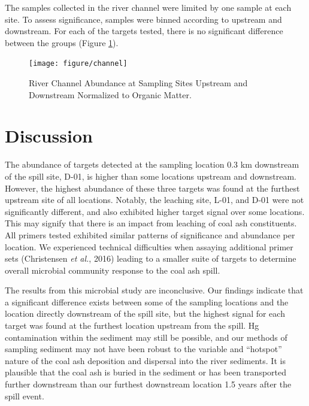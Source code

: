 \documentclass[ms, hidelinks]{uncgdissertationexp}
\theoremstyle{plain}
\theoremstyle{definition}
\theoremstyle{remark}
\begin{document}
The samples collected in the river channel were limited by one sample at each site. To assess significance, samples were binned according to upstream and downstream. For each of the targets tested, there is no significant difference between the groups (Figure \ref{fig:channel}).
\begin{figure}[htbp]
  \texttt{[image: figure/channel]}
  \caption[River Channel Abundance at Sampling Sites Upstream and Downstream Normalized to Organic Matter.]{River Channel Abundance at Sampling Sites Upstream and Downstream Normalized to Organic Matter.}\label{fig:channel}
\end{figure}
\hypertarget{discussion}{%
\section{Discussion}\label{discussion}}

The abundance of targets detected at the sampling location 0.3 km downstream of the spill site, D-01, is higher than some locations upstream and downstream. However, the highest abundance of these three targets was found at the furthest upstream site of all locations. Notably, the leaching site, L-01, and D-01 were not significantly different, and also exhibited higher target signal over some locations. This may signify that there is an impact from leaching of coal ash constituents. All primers tested exhibited similar patterns of significance and abundance per location. We experienced technical difficulties when assaying additional primer sets (Christensen \emph{et al.}, 2016)
leading to a smaller suite of targets to determine overall microbial community response to the coal ash spill.

The results from this microbial study are inconclusive. Our findings indicate that a significant difference exists between some of the sampling locations and the location directly downstream of the spill site, but the highest signal for each target was found at the furthest location upstream from the spill. Hg contamination within the sediment may still be possible, and our methods of sampling sediment may not have been robust to the variable and ``hotspot'' nature of the coal ash deposition and dispersal into the river sediments. It is plausible that the coal ash is buried in the sediment or has been transported further downstream than our furthest downstream location 1.5 years after the spill event.
\end{document}
